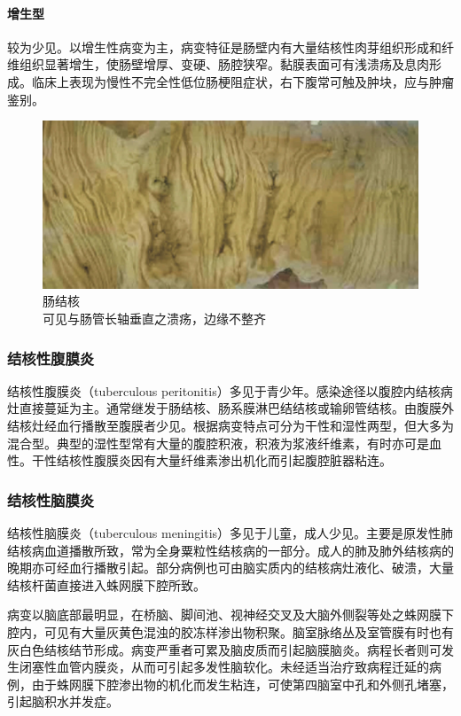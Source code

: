 \paragraph{增生型}
较为少见。以增生性病变为主，病变特征是肠壁内有大量结核性肉芽组织形成和纤维组织显著增生，使肠壁增厚、变硬、肠腔狭窄。黏膜表面可有浅溃疡及息肉形成。临床上表现为慢性不完全性低位肠梗阻症状，右下腹常可触及肿块，应与肿瘤鉴别。

\begin{figure}[!htbp]
    \centering
    \includegraphics{./images/Image00233.jpg}
    \captionsetup{justification=centering}
    \caption{肠结核\\ {\small 可见与肠管长轴垂直之溃疡，边缘不整齐}}
    \label{fig14-8}
\end{figure}

\subsubsection{结核性腹膜炎}

结核性腹膜炎（tuberculous
peritonitis）多见于青少年。感染途径以腹腔内结核病灶直接蔓延为主。通常继发于肠结核、肠系膜淋巴结结核或输卵管结核。由腹膜外结核灶经血行播散至腹膜者少见。根据病变特点可分为干性和湿性两型，但大多为混合型。典型的湿性型常有大量的腹腔积液，积液为浆液纤维素，有时亦可是血性。干性结核性腹膜炎因有大量纤维素渗出机化而引起腹腔脏器粘连。

\subsubsection{结核性脑膜炎}

结核性脑膜炎（tuberculous
meningitis）多见于儿童，成人少见。主要是原发性肺结核病血道播散所致，常为全身粟粒性结核病的一部分。成人的肺及肺外结核病的晚期亦可经血行播散引起。部分病例也可由脑实质内的结核病灶液化、破溃，大量结核杆菌直接进入蛛网膜下腔所致。

病变以脑底部最明显，在桥脑、脚间池、视神经交叉及大脑外侧裂等处之蛛网膜下腔内，可见有大量灰黄色混浊的胶冻样渗出物积聚。脑室脉络丛及室管膜有时也有灰白色结核结节形成。病变严重者可累及脑皮质而引起脑膜脑炎。病程长者则可发生闭塞性血管内膜炎，从而可引起多发性脑软化。未经适当治疗致病程迁延的病例，由于蛛网膜下腔渗出物的机化而发生粘连，可使第四脑室中孔和外侧孔堵塞，引起脑积水并发症。


